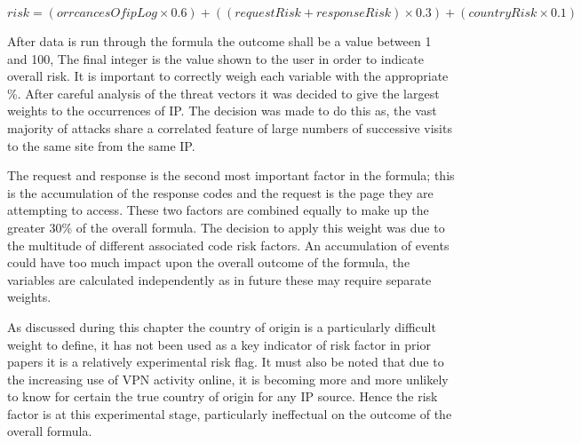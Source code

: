 \[risk = (orrcancesOfipLog \times 0.6) + ((requestRisk+responseRisk) \times 0.3) + (countryRisk \times  0.1) \]

After data is run through the formula the outcome shall be a value between 1 and 100, The final integer is the value shown to the user in order to indicate overall risk. It is important to correctly weigh each variable with the appropriate \%. After careful analysis of the threat vectors it was decided to give the largest weights to the occurrences of IP. The decision was made to do this as, the vast majority of attacks share a correlated feature of large numbers of successive visits to the same site from the same IP. 

The request and response is the second most important factor in the formula; this is the accumulation of the response codes and the request is the page they are attempting to access. These two factors are combined equally to make up the greater 30\% of the overall formula. The decision to apply this weight was due to the multitude of different associated code risk factors. An accumulation of events could have too much impact upon the overall outcome of the formula, the variables are calculated independently as in future these may require separate weights.

As discussed during this chapter the country of origin is a particularly difficult weight to define, it has not been used as a key indicator of risk factor in prior papers it is a relatively experimental risk flag. It must also be noted that due to the increasing use of VPN activity online, it is becoming more and more unlikely to know for certain the true country of origin for any IP source. Hence the risk factor is at this experimental stage, particularly ineffectual on the outcome of the overall formula.

